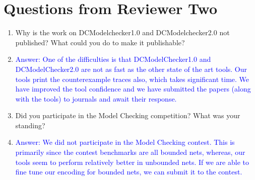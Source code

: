 \documentclass{article}
\newcommand{\answer}[1]{\item[] \textcolor{blue}{Answer: #1}}
\begin{document}
\section{Questions from Reviewer Two}
\begin{enumerate}
      \item Why is the work on DCModelchecker1.0 and DCModelchecker2.0 not published? What could you do to make it publishable?
            \answer{ One of the difficulties is that DCModelChecker1.0 and DCModelChecker2.0 are not as fast as the other state of the art tools. Our tools print the counterexample traces also, which takes significant time. We have improved the tool confidence and we have submitted the papers (along with the tools) to journals and await their response.}
      \item Did you participate in the Model Checking competition? What was your standing?
            \answer{We did not participate in the Model Checking contest. This is primarily since the contest benchmarks are all bounded nets, whereas, our tools seem to perform relatively better in unbounded nets. If we are able to fine tune our encoding for bounded nets, we can submit it to the contest.}
\end{enumerate}
\end{document}
